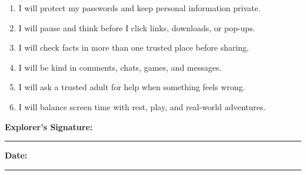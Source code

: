 \begin{enumerate}[label=\textbf{\arabic*.}]
  \item I will protect my passwords and keep personal information private.
  \item I will pause and think before I click links, downloads, or pop-ups.
  \item I will check facts in more than one trusted place before sharing.
  \item I will be kind in comments, chats, games, and messages.
  \item I will ask a trusted adult for help when something feels wrong.
  \item I will balance screen time with rest, play, and real-world adventures.
\end{enumerate}

\vspace{6pt}
\begin{center}
  \begin{tcolorbox}[colback=SunYellow!15,colframe=SunYellow!70!black,arc=8pt,boxrule=1pt,width=0.9\linewidth]
    \textbf{Explorer's Signature:} \rule{0.48\linewidth}{0.4pt}\hfill
    \textbf{Date:} \rule{0.2\linewidth}{0.4pt}
  \end{tcolorbox}
\end{center}

